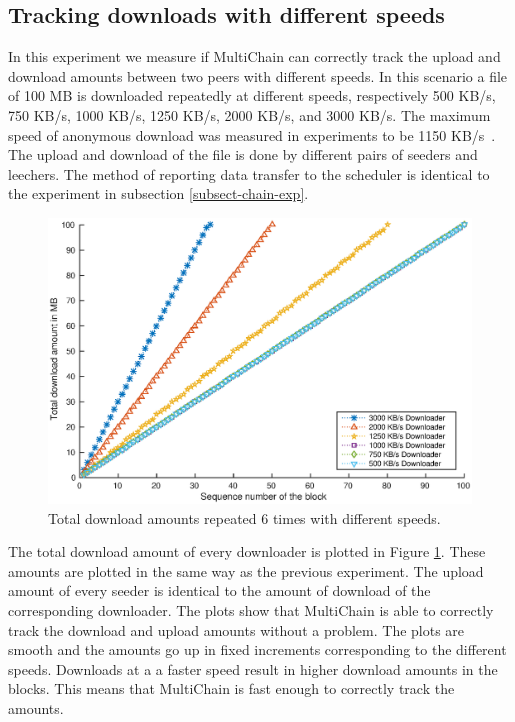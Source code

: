 \subsection{Tracking downloads with different speeds}
In this experiment we measure if MultiChain can correctly track the upload and download amounts
between two peers with different speeds.
In this scenario a file of 100 MB is downloaded repeatedly at different speeds,
respectively 500 KB/s, 750 KB/s, 1000 KB/s, 1250 KB/s, 2000 KB/s, and 3000 KB/s.
The maximum speed of anonymous download was measured in experiments to be 1150 KB/s~\cite{ruigrok-anonymous}.
The upload and download of the file is done by different pairs of seeders and leechers.
The method of reporting data transfer to the scheduler is identical to the experiment in subsection \ref{subsect-chain-exp}.

\begin{figure}
\centerline{\includegraphics[scale=0.5]{experimentation/speeds/synthetic-simple-down.eps}}
\caption{Total download amounts repeated 6 times with different speeds.}
\label{fig:synthetic-simple-amounts}
\end{figure}

The total download amount of every downloader is plotted in Figure \ref{fig:synthetic-simple-amounts}.
These amounts are plotted in the same way as the previous experiment.
The upload amount of every seeder is identical to the amount of download of the corresponding downloader.
The plots show that MultiChain is able to correctly track the download and upload amounts without a problem.
The plots are smooth and the amounts go up in fixed increments corresponding to the different speeds.
Downloads at a a faster speed result in higher download amounts in the blocks.
This means that MultiChain is fast enough to correctly track the amounts.

